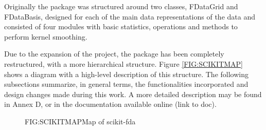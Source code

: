 
Originally the package was structured around two classes, FDataGrid and
FDataBasis, designed for each of the main data representations of the data and
consisted of four modules with basic statistics, operations and methods to
perform kernel smoothing.

Due to the expansion of the project, the package has been completely
restructured, with a more hierarchical structure. Figure \ref{FIG:SCIKITMAP}
shows a diagram with a high-level description of this structure. The following
subsections summarize, in general terms, the functionalities incorporated and
design changes made during this work. A more detailed description may be found
in Annex D, or in the documentation available online (link to doc).

\begin{figure}[Map of scikit-fda]{FIG:SCIKITMAP}{Map of scikit-fda}
\end{figure}
